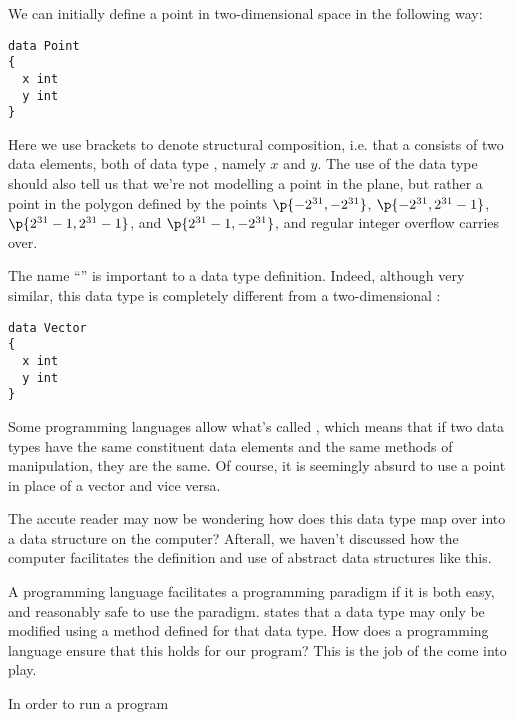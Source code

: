 We can initially define a point in two-dimensional space in the following way:

\begin{verbatim}
data Point
{
  x int
  y int
}
\end{verbatim}

Here we use brackets to denote structural composition, i.e. that a 
consists of two data elements, both of data type , namely $x$ and
$y$. The use of the data type  should also tell us that we're not
modelling a point in the plane, but rather a point in the polygon defined by
the points $\p{-2^{31},-2^{31}}$, $\p{-2^{31},2^{31}-1}$,
$\p{2^{31}-1,2^{31}-1}$, and $\p{2^{31}-1,-2^{31}}$, and regular integer
overflow carries over.

The name ``'' is important to a data type definition. Indeed,
although very similar, this data type is completely different from a
two-dimensional :

\begin{verbatim}
data Vector
{
  x int
  y int
}
\end{verbatim}

Some programming languages allow what's called , which
means that if two data types have the same constituent data elements and the
same methods of manipulation, they are the same. Of course, it is seemingly
absurd to use a point in place of a vector and vice versa.


The accute reader may now be wondering how does this data type map over into a
data structure on the computer? Afterall, we haven't discussed how the computer
facilitates the definition and use of abstract data structures like this.


A programming language facilitates a programming paradigm if it is both easy,
and reasonably safe to use the paradigm.  states
that a data type may only be modified using a method defined for that data
type. How does a programming language ensure that this holds for our program?
This is the job of the  come into play.

In order to run a program




